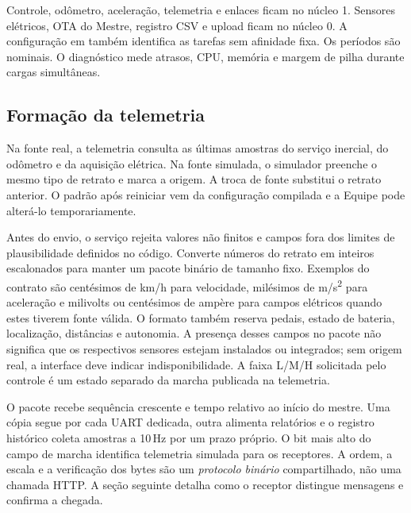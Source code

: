 Controle, odômetro, aceleração, telemetria e enlaces ficam no núcleo 1. Sensores elétricos, OTA do Mestre, registro CSV e upload ficam no núcleo 0. A configuração em  também identifica as tarefas sem afinidade fixa. Os períodos são nominais. O diagnóstico mede atrasos, CPU, memória e margem de pilha durante cargas simultâneas.

\subsection{Formação da telemetria}
Na fonte real, a telemetria consulta as últimas amostras do serviço inercial, do odômetro e da aquisição elétrica. Na fonte simulada, o simulador preenche o mesmo tipo de retrato e marca a origem. A troca de fonte substitui o retrato anterior. O padrão após reiniciar vem da configuração compilada e a Equipe pode alterá-lo temporariamente.

Antes do envio, o serviço rejeita valores não finitos e campos fora dos limites de plausibilidade definidos no código. Converte números do retrato em inteiros escalonados para manter um pacote binário de tamanho fixo. Exemplos do contrato são centésimos de km/h para velocidade, milésimos de m/s\textsuperscript{2} para aceleração e milivolts ou centésimos de ampère para campos elétricos quando estes tiverem fonte válida. O formato também reserva pedais, estado de bateria, localização, distâncias e autonomia. A presença desses campos no pacote não significa que os respectivos sensores estejam instalados ou integrados; sem origem real, a interface deve indicar indisponibilidade. A faixa L/M/H solicitada pelo controle é um estado separado da marcha publicada na telemetria.

O pacote recebe sequência crescente e tempo relativo ao início do mestre. Uma cópia segue por cada UART dedicada, outra alimenta relatórios e o registro histórico coleta amostras a 10\,Hz por um prazo próprio. O bit mais alto do campo de marcha identifica telemetria simulada para os receptores. A ordem, a escala e a verificação dos bytes são um \emph{protocolo binário} compartilhado, não uma chamada HTTP. A seção seguinte detalha como o receptor distingue mensagens e confirma a chegada.


